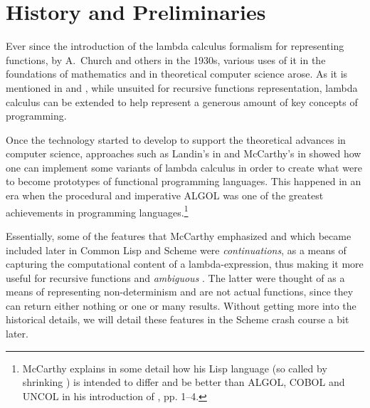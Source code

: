 
\chapter{History and Preliminaries}


Ever since the introduction of the lambda calculus formalism for representing
functions, by A.\ Church and others in the 1930s, various uses of it in the
foundations of mathematics and in theoretical computer science arose. As it
is mentioned in \cite{mccarthy61} and \cite{mccarthy62}, while unsuited for
recursive functions representation, lambda calculus can be extended to help
represent a generous amount of key concepts of programming.

Once the technology started to develop to support the theoretical advances
in computer science, approaches such as Landin's in \cite{Landin1964TheME}
and McCarthy's in \cite{mccarthy60} showed how one can 
implement some variants of lambda calculus in order to create what were to
become prototypes of functional programming languages. This happened in an
era when the procedural and imperative ALGOL was one of the greatest
achievements in programming languages.\footnote{McCarthy explains in some
  detail how his Lisp language (so called by shrinking )
  is intended to differ and be better than ALGOL, COBOL and UNCOL in his
  introduction of \cite{mccarthy61}, pp. 1--4.}

Essentially, some of the features that McCarthy emphasized and which became
included later in Common Lisp and Scheme were \emph{continuations}, as a means
of capturing the computational content of a lambda-expression, thus making it
more useful for recursive functions and \emph{ambiguous }. The
latter were thought of as a means of representing non-determinism and
are not actual functions, since they can return either nothing or one or
many results. Without getting more into the historical details, we will
detail these features in the Scheme crash course a bit later.

